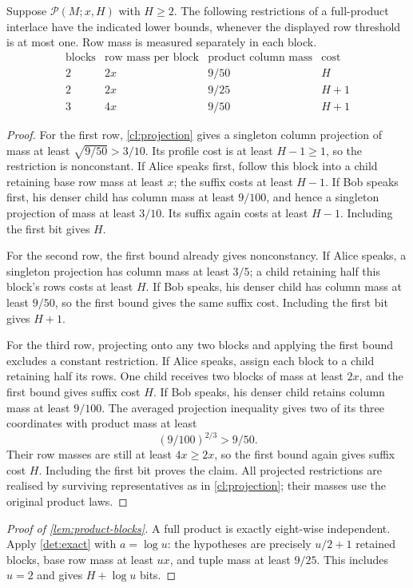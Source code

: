 \documentclass[11pt]{article} \usepackage[utf8]{inputenc}
\theoremstyle{plain} \newtheorem{theorem}{Theorem}[section]
\theoremstyle{definition} \newaliascnt{definition}{theorem}
\newcommand{\RP}[3]{\mathcal{P}(#1;#2,#3)}
\begin{document}
\begin{lemma}\label{lem:small-blocks}
Suppose $\RP{M}{x}{H}$ with $H\ge2$. The following restrictions of a
full-product interlace have the indicated lower bounds, whenever the displayed
row threshold is at most one. Row mass is measured separately in each block.
\[
\begin{array}{c|c|c|c}
\text{blocks}&\text{row mass per block}&\text{product column mass}&\text{cost}\\
\hline
2&2x&9/50&H\\
2&2x&9/25&H+1\\
3&4x&9/50&H+1
\end{array}
\]
\end{lemma}
\begin{proof}
For the first row, \cref{cl:projection} gives a singleton column projection
of mass at least $\sqrt{9/50}>3/10$. Its profile cost is at least $H-1\ge1$,
so the restriction is nonconstant. If Alice speaks first, follow this block
into a child retaining base row mass at least $x$; the suffix costs at least
$H-1$. If Bob speaks first, his denser child has column mass at least $9/100$,
and hence a singleton projection of mass at least $3/10$. Its suffix again
costs at least $H-1$. Including the first bit gives $H$.

For the second row, the first bound already gives nonconstancy. If Alice
speaks, a singleton projection has column mass at least $3/5$; a child
retaining half this block's rows costs at least $H$. If Bob speaks, his denser
child has column mass at least $9/50$, so the first bound gives the same suffix
cost. Including the first bit gives $H+1$.

For the third row, projecting onto any two blocks and applying the first bound
excludes a constant restriction. If Alice speaks, assign each block to a child
retaining half its rows. One child receives two blocks of mass at least $2x$,
and the first bound gives suffix cost $H$. If Bob speaks, his denser child
retains column mass at least $9/100$. The averaged projection inequality gives
two of its three coordinates with product mass at least
\[
(9/100)^{2/3}>9/50.
\]
Their row masses are still at least $4x\ge2x$, so the first bound again gives
suffix cost $H$. Including the first bit proves the claim. All projected
restrictions are realised by surviving representatives as in
\cref{cl:projection}; their masses use the original product laws.
\end{proof}

\begin{proof}[Proof of \cref{lem:product-blocks}]
A full product is exactly eight-wise independent. Apply \cref{det:exact} with
$a=\log u$: the hypotheses are precisely $u/2+1$ retained blocks, base row mass
at least $ux$, and tuple mass at least $9/25$. This includes $u=2$ and gives
$H+\log u$ bits.
\end{proof}
\end{document}
